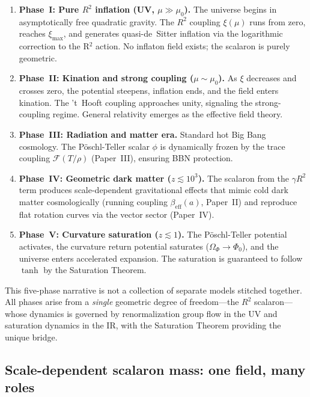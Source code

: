 \documentclass[aps,prd,twocolumn,superscriptaddress,nofootinbib]{revtex4-2}
\begin{document}
\begin{enumerate}
\item \textbf{Phase~I: Pure $R^2$ inflation (UV, $\mu \gg \mu_0$).} The universe begins in asymptotically free quadratic gravity. The $R^2$ coupling $\xi(\mu)$ runs from zero, reaches $\xi_\mathrm{max}$, and generates quasi-de~Sitter inflation via the logarithmic correction to the R$^2$ action. No inflaton field exists; the scalaron is purely geometric.

\item \textbf{Phase~II: Kination and strong coupling ($\mu \sim \mu_0$).} As $\xi$ decreases and crosses zero, the potential steepens, inflation ends, and the field enters kination. The 't~Hooft coupling approaches unity, signaling the strong-coupling regime. General relativity emerges as the effective field theory.

\item \textbf{Phase~III: Radiation and matter era.} Standard hot Big Bang cosmology. The P\"oschl-Teller scalar $\phi$ is dynamically frozen by the trace coupling $\mathcal{F}(T/\rho)$ (Paper~III), ensuring BBN protection.

\item \textbf{Phase~IV: Geometric dark matter ($z \lesssim 10^3$).} The scalaron from the $\gamma R^2$ term produces scale-dependent gravitational effects that mimic cold dark matter cosmologically (running coupling $\beta_\mathrm{eff}(a)$, Paper~II) and reproduce flat rotation curves via the vector sector (Paper~IV).

\item \textbf{Phase~V: Curvature saturation ($z \lesssim 1$).} The P\"oschl-Teller potential activates, the curvature return potential saturates ($\Omega_\Phi \to \Phi_0$), and the universe enters accelerated expansion. The saturation is guaranteed to follow $\tanh$ by the Saturation Theorem.
\end{enumerate}

This five-phase narrative is not a collection of separate models stitched together. All phases arise from a \textit{single} geometric degree of freedom---the $R^2$ scalaron---whose dynamics is governed by renormalization group flow in the UV and saturation dynamics in the IR, with the Saturation Theorem providing the unique bridge.

\subsection{Scale-dependent scalaron mass: one field, many roles}
\label{sec:scalaron-mass}
\end{document}
